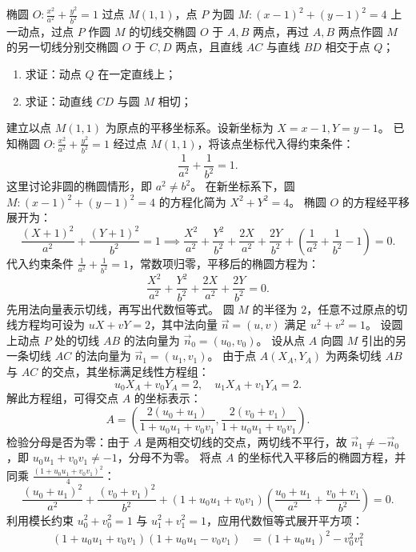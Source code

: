 \begin{example}
椭圆 \(O: \frac{x^2}{a^2} + \frac{y^2}{b^2} = 1\) 过点 \(M(1,1)\)，点 \(P\) 为圆 \(M: (x-1)^2 + (y-1)^2 = 4\) 上一动点，过点 \(P\) 作圆 \(M\) 的切线交椭圆 \(O\) 于 \(A,B\) 两点，再过 \(A,B\) 两点作圆 \(M\) 的另一切线分别交椭圆 \(O\) 于 \(C,D\) 两点，且直线 \(AC\) 与直线 \(BD\) 相交于点 \(Q\)；
\begin{enumerate}
    \item[(1)] 求证：动点 \(Q\) 在一定直线上；
    \item[(2)] 求证：动直线 \(CD\) 与圆 \(M\) 相切；
\end{enumerate}
\end{example}
\begin{solution}
建立以点 $M(1,1)$ 为原点的平移坐标系。设新坐标为 $X = x - 1, Y = y - 1$。
已知椭圆 $O: \frac{x^2}{a^2} + \frac{y^2}{b^2} = 1$ 经过点 $M(1,1)$，将该点坐标代入得约束条件：
\[ \frac{1}{a^2} + \frac{1}{b^2} = 1. \]
这里讨论非圆的椭圆情形，即 $a^2 \neq b^2$。
在新坐标系下，圆 $M: (x-1)^2 + (y-1)^2 = 4$ 的方程化简为 $X^2 + Y^2 = 4$。
椭圆 $O$ 的方程经平移展开为：
\[ \frac{(X+1)^2}{a^2} + \frac{(Y+1)^2}{b^2} = 1 \implies \frac{X^2}{a^2} + \frac{Y^2}{b^2} + \frac{2X}{a^2} + \frac{2Y}{b^2} + \left(\frac{1}{a^2} + \frac{1}{b^2} - 1\right) = 0. \]
代入约束条件 $\frac{1}{a^2} + \frac{1}{b^2} = 1$，常数项归零，平移后的椭圆方程为：
\[ \frac{X^2}{a^2} + \frac{Y^2}{b^2} + \frac{2X}{a^2} + \frac{2Y}{b^2} = 0. \]
先用法向量表示切线，再写出代数恒等式。
圆 $M$ 的半径为 $2$，任意不过原点的切线方程均可设为 $u X + v Y = 2$，其中法向量 $\vec{n} = (u,v)$ 满足 $u^2 + v^2 = 1$。
设圆上动点 $P$ 处的切线 $AB$ 的法向量为 $\vec{n}_0 = (u_0, v_0)$。
设从点 $A$ 向圆 $M$ 引出的另一条切线 $AC$ 的法向量为 $\vec{n}_1 = (u_1, v_1)$。
由于点 $A(X_A, Y_A)$ 为两条切线 $AB$ 与 $AC$ 的交点，其坐标满足线性方程组：
\[ u_0 X_A + v_0 Y_A = 2, \quad u_1 X_A + v_1 Y_A = 2. \]
解此方程组，可得交点 $A$ 的坐标表示：
\[ A = \left( \frac{2(u_0+u_1)}{1+u_0 u_1+v_0 v_1}, \frac{2(v_0+v_1)}{1+u_0 u_1+v_0 v_1} \right). \]
检验分母是否为零：由于 $A$ 是两相交切线的交点，两切线不平行，故 $\vec{n}_1 \neq -\vec{n}_0$，即 $u_0 u_1 + v_0 v_1 \neq -1$，分母不为零。
将点 $A$ 的坐标代入平移后的椭圆方程，并同乘 $\frac{(1+u_0 u_1+v_0 v_1)^2}{4}$：
\[ \frac{(u_0+u_1)^2}{a^2} + \frac{(v_0+v_1)^2}{b^2} + (1+u_0 u_1+v_0 v_1) \left( \frac{u_0+u_1}{a^2} + \frac{v_0+v_1}{b^2} \right) = 0. \]
利用模长约束 $u_0^2+v_0^2 = 1$ 与 $u_1^2+v_1^2 = 1$，应用代数恒等式展开平方项：
\begin{align*}
(1+u_0 u_1+v_0 v_1)(1+u_0 u_1-v_0 v_1) &= (1+u_0 u_1)^2 - v_0^2 v_1^2 \\

\end{align*}
\end{solution}
